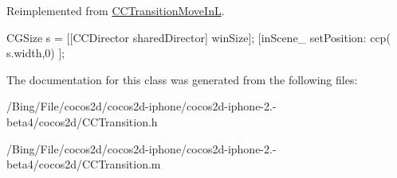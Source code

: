 Reimplemented from \hyperlink{interface_c_c_transition_move_in_l_a0cb17195dedf0a4778ede1324068fdaf}{C\-C\-Transition\-Move\-In\-L}.


\begin{DoxyCode}
{
        CGSize s = [[CCDirector sharedDirector] winSize];
        [inScene_ setPosition: ccp( s.width,0) ];
}
\end{DoxyCode}


The documentation for this class was generated from the following files\-:\begin{DoxyCompactItemize}
\item 
/\-Bing/\-File/cocos2d/cocos2d-\/iphone/cocos2d-\/iphone-\/2.-\/beta4/cocos2d/C\-C\-Transition.\-h\item 
/\-Bing/\-File/cocos2d/cocos2d-\/iphone/cocos2d-\/iphone-\/2.-\/beta4/cocos2d/C\-C\-Transition.\-m\end{DoxyCompactItemize}
